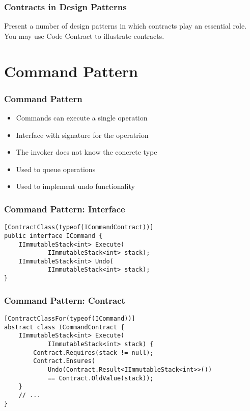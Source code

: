

\begin{frame}
    \frametitle{Contracts in Design Patterns}

    Present a number of design patterns in which contracts play an essential
    role. You may use Code Contract to illustrate contracts.
\end{frame}

\section{Command Pattern}

\begin{frame}
    \frametitle{Command Pattern}
    \begin{itemize}
        \item Commands can execute a single operation
        \pause \item Interface with signature for the operatrion
        \pause \item The invoker does not know the concrete type
        \pause \item Used to queue operations
        \pause \item Used to implement undo functionality
    \end{itemize}
\end{frame}

\begin{frame}[fragile]
    \frametitle{Command Pattern: Interface}

    \begin{verbatim}
[ContractClass(typeof(ICommandContract))]
public interface ICommand {
    IImmutableStack<int> Execute(
            IImmutableStack<int> stack);
    IImmutableStack<int> Undo(
            IImmutableStack<int> stack);
}
    \end{verbatim}
\end{frame}


\begin{frame}[fragile]
    \frametitle{Command Pattern: Contract}

    \begin{verbatim}
[ContractClassFor(typeof(ICommand))]
abstract class ICommandContract {
    IImmutableStack<int> Execute(
            IImmutableStack<int> stack) {
        Contract.Requires(stack != null);
        Contract.Ensures(
            Undo(Contract.Result<IImmutableStack<int>>())
            == Contract.OldValue(stack));
    }
    // ...
}
    \end{verbatim}
\end{frame}


